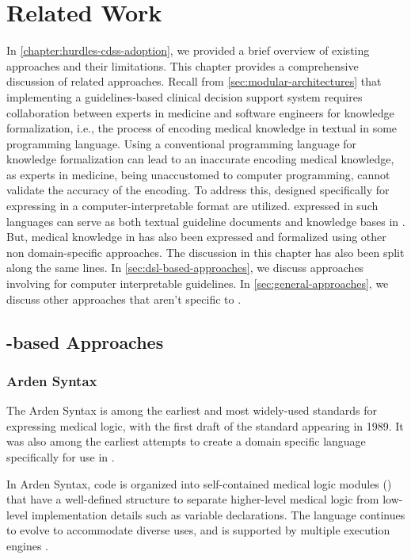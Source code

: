 \chapter{Related Work}\label{chapter:related-work}

In \autoref{chapter:hurdles-cdss-adoption}, we provided a brief
overview of existing approaches and their limitations. This chapter
provides a comprehensive discussion of related approaches. Recall
from \autoref{sec:modular-architectures} that implementing a guidelines-based
clinical decision support system requires collaboration between
experts in medicine and software engineers for knowledge formalization, i.e.,
the process of encoding medical knowledge in textual
\BPGs{} in some programming language. Using a conventional programming
language for knowledge formalization can lead to an inaccurate
encoding medical knowledge, as experts in medicine, being unaccustomed
to computer programming, cannot validate the accuracy of the encoding.
To address this, \DSLs{} designed specifically for expressing
\BPGs{} in a computer-interpretable format are utilized. \BPGs{} expressed
in such languages can serve as both textual guideline documents and knowledge
bases in \CDSSs{}. But, medical knowledge in \BPGs{} has also been expressed
and formalized using other non domain-specific approaches. The discussion in
this chapter has also been split along the same lines. In \autoref{sec:dsl-based-approaches}, we discuss approaches involving \DSLs{} for
computer interpretable guidelines. In \ref{sec:general-approaches}, we
discuss other approaches that aren't specific to \BPGs{}.

\section{\DSL{}-based Approaches}\label{sec:dsl-based-approaches}

\subsection{Arden Syntax}\label{sec:arden-syntax}

The Arden Syntax is among the earliest and most widely-used
standards for expressing medical logic, with the first
draft of the standard appearing in 1989.
It was also among the earliest attempts to create a domain
specific language specifically for use in \CDSSs{} \cite{SamwaldJBI12}.

In Arden Syntax, code is organized into self-contained medical
logic modules (\MLMs{}) that have a well-defined structure to
separate higher-level medical logic from low-level implementation
details such as variable declarations. The language continues to
evolve to accommodate diverse uses, and is supported by multiple execution
engines \cite{AnandMed04,KaradimasAMIA02}.

